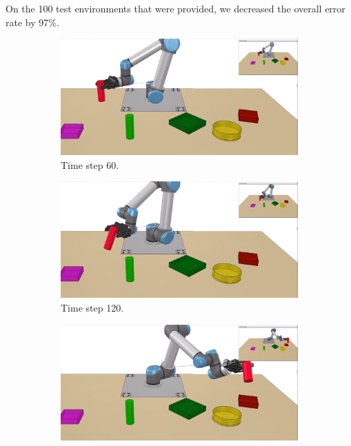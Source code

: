 On the 100 test environments that were provided, we decreased the overall error rate by 97$ \% $. 
\begin{figure}
    \captionsetup[subfigure]{justification=Centering, labelformat=empty}
    \begin{subfigure}[t]{0.18\textwidth}
        \includegraphics[width=\textwidth]{images/Language_Conditioned_Exp/theirs_1.png}
        \caption{Time step 60.}
    \end{subfigure}
    \begin{subfigure}[t]{0.18\textwidth}
        \includegraphics[width=\linewidth]{images/Language_Conditioned_Exp/theirs_2.png}
        \caption{Time step 120.}
    \end{subfigure}
    \begin{subfigure}[t]{0.18\textwidth}
        \includegraphics[width=\linewidth]{images/Language_Conditioned_Exp/theirs_3.png}

\end{subfigure}
\end{figure}
